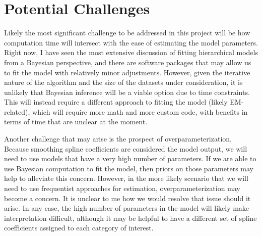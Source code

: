 \documentclass[11pt, reqno]{article}
\begin{document}
\section{Potential Challenges}

Likely the most significant challenge to be addressed in this project will be how computation time will intersect with the ease of estimating the model parameters. Right now, I have seen the most extensive discussion of fitting hierarchical models from a Bayesian perspective, and there are software packages that may allow us to fit the model with relatively minor adjustments. However, given the iterative nature of the algorithm and the size of the datasets under consideration, it is unlikely that Bayesian inference will be a viable option due to time constraints. This will instead require a different approach to fitting the model (likely EM-related), which will require more math and more custom code, with benefits in terms of time that are unclear at the moment.

Another challenge that may arise is the prospect of overparameterization. Because smoothing spline coefficients are considered the model output, we will need to use models that have a very high number of parameters. If we are able to use Bayesian computation to fit the model, then priors on those parameters may help to alleviate this concern. However, in the more likely scenario that we will need to use frequentist approaches for estimation, overparameterization may become a concern. It is unclear to me how we would resolve that issue should it arise. In any case, the high number of parameters in the model will likely make interpretation difficult, although it may be helpful to have a different set of spline coefficients assigned to each category of interest.

\nocite{*}
\printbibliography
\end{document}
